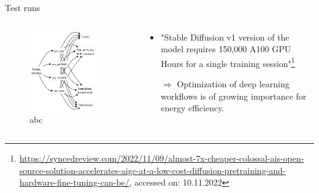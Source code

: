 \documentclass[compress,aspectratio=169]{beamer}
\begin{document}
\begin{frame}{Test runs}
\label{pg:lastpage} %

\begin{columns}
        \begin{column}{0.5\textwidth}
            \centering
            \vspace{-1em}
            \begin{figure}
            \includegraphics[width=0.85\textwidth]{../../data/runs.png}
            \caption*{abc}
            \end{figure}
        \end{column}
        \begin{column}{0.5\textwidth}
            \begin{itemize}
                \item "Stable Diffusion v1 version of the model requires 150,000 A100 GPU Hours for a single training session"\footnote{\tiny{\url{https://syncedreview.com/2022/11/09/almost-7x-cheaper-colossal-ais-open-source-solution-accelerates-aigc-at-a-low-cost-diffusion-pretraining-and-hardware-fine-tuning-can-be/}}, accessed on: 10.11.2022}
                \vspace{1em}
                \item[$\Rightarrow$] Optimization of deep learning workflows is of growing importance for energy efficiency.
            \end{itemize}
        \end{column}
    \end{columns}

\end{frame}
\end{document}
